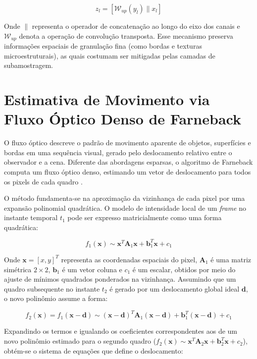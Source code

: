 \begin{equation}
    z_l = [ \mathcal{W}_{up}(y_l) \parallel x_l ]
\end{equation}

Onde $\parallel$ representa o operador de concatenação ao longo do eixo dos canais e $\mathcal{W}_{up}$ denota a operação de convolução transposta. Esse mecanismo preserva informações espaciais de granulação fina (como bordas e texturas microestruturais), as quais costumam ser mitigadas pelas camadas de subamostragem.

\section{Estimativa de Movimento via Fluxo Óptico Denso de Farneback}
\label{sec:farneback}

O fluxo óptico descreve o padrão de movimento aparente de objetos, superfícies e bordas em uma sequência visual, gerado pelo deslocamento relativo entre o observador e a cena. Diferente das abordagens esparsas, o algoritmo de Farneback computa um fluxo óptico denso, estimando um vetor de deslocamento para todos os pixels de cada quadro \cite{farneback2003two}.

O método fundamenta-se na aproximação da vizinhança de cada pixel por uma expansão polinomial quadrática. O modelo de intensidade local de um \textit{frame} no instante temporal $t_1$ pode ser expresso matricialmente como uma forma quadrática:

\begin{equation}
    f_1(\mathbf{x}) \sim \mathbf{x}^T \mathbf{A}_1 \mathbf{x} + \mathbf{b}_1^T \mathbf{x} + c_1
\end{equation}

Onde $\mathbf{x} = [x, y]^T$ representa as coordenadas espaciais do pixel, $\mathbf{A}_1$ é uma matriz simétrica $2\times2$, $\mathbf{b}_1$ é um vetor coluna e $c_1$ é um escalar, obtidos por meio do ajuste de mínimos quadrados ponderados na vizinhança. Assumindo que um quadro subsequente no instante $t_2$ é gerado por um deslocamento global ideal $\mathbf{d}$, o novo polinômio assume a forma:

\begin{equation}
    f_2(\mathbf{x}) = f_1(\mathbf{x} - \mathbf{d}) \sim (\mathbf{x} - \mathbf{d})^T \mathbf{A}_1 (\mathbf{x} - \mathbf{d}) + \mathbf{b}_1^T (\mathbf{x} - \mathbf{d}) + c_1
\end{equation}

Expandindo os termos e igualando os coeficientes correspondentes aos de um novo polinômio estimado para o segundo quadro ($f_2(\mathbf{x}) \sim \mathbf{x}^T \mathbf{A}_2 \mathbf{x} + \mathbf{b}_2^T \mathbf{x} + c_2$), obtém-se o sistema de equações que define o deslocamento:

